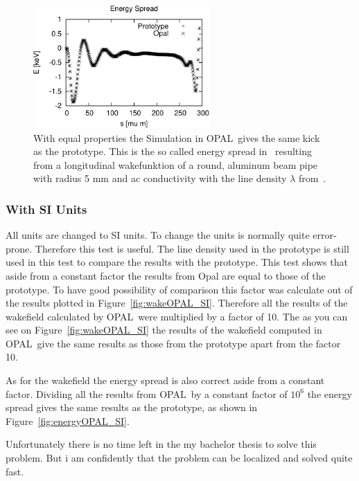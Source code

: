 \documentclass[11pt,a4paper]{article}
\newcommand{\opal}{\textsc{OPAL}}
\begin{document}
\begin{figure}[htb]
\begin{center}
\includegraphics[width=0.6\textwidth]{wakeCompare/energy_Lo_Circ_Cu_AC_5_Opal.pdf} 
\caption{With equal properties the Simulation in \opal\ gives the same kick as the prototype. This is the so called energy spread in~\cite{notebook} resulting from a longitudinal wakefunktion of a round, aluminum beam pipe with radius 5 mm and ac conductivity with the line density $\lambda$ from~\cite{notebook}. \label{fig:energyOPAL} }
\end{center}
\end{figure}

\clearpage
\subsubsection{With SI Units}
All units are changed to SI units. To change the units is normally  quite error-prone. Therefore this test is useful. The line density used in the prototype is still used in this test to compare the results with the prototype. This test shows that aside from a constant factor the results from Opal are equal to those of the prototype. To have good possibility of comparison this factor was calculate out of the results plotted in Figure~\ref{fig:wakeOPAL_SI}. Therefore all the results of the wakefield calculated by \opal\ were multiplied by a factor of 10. The as you can see on Figure~\ref{fig:wakeOPAL_SI} the results of the wakefield computed in \opal\ give the same results as those from the prototype apart from the factor 10.

As for the wakefield the energy spread is also correct aside from a constant factor. Dividing all the results from \opal\ by a constant factor of $10^6$ the energy spread gives the same results as the prototype, as shown in Figure~\ref{fig:energyOPAL_SI}.

Unfortunately there is no time left in the my bachelor thesis to solve this problem. But i am confidently that the problem can be localized and solved quite fast.
\end{document}
